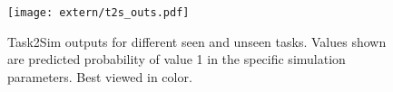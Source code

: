 \begin{figure}[b]
    \centering
  \vspace{-4mm}
    \texttt{[image: extern/t2s\_outs.pdf]}
    \caption{Task2Sim outputs for different seen and unseen tasks. Values shown are predicted probability of value 1 in the specific simulation parameters. Best viewed in color.}
    \label{fig:t2s_outputs}
\end{figure}
